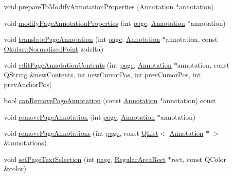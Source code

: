 \begin{DoxyCompactItemize}
\item 
void \hyperlink{classOkular_1_1Document_afa545702ebb74572fd51361c4675bb92}{prepare\+To\+Modify\+Annotation\+Properties} (\hyperlink{classOkular_1_1Annotation}{Annotation} $\ast$annotation)
\item 
void \hyperlink{classOkular_1_1Document_a6124172e56443498f612a32bab2e1e94}{modify\+Page\+Annotation\+Properties} (int \hyperlink{classOkular_1_1Document_a1c95c2f192d739c217d00971da48f69d}{page}, \hyperlink{classOkular_1_1Annotation}{Annotation} $\ast$annotation)
\item 
void \hyperlink{classOkular_1_1Document_ab3ca55619ce1a60a4d60913a216ae01c}{translate\+Page\+Annotation} (int \hyperlink{classOkular_1_1Document_a1c95c2f192d739c217d00971da48f69d}{page}, \hyperlink{classOkular_1_1Annotation}{Annotation} $\ast$annotation, const \hyperlink{classOkular_1_1NormalizedPoint}{Okular\+::\+Normalized\+Point} \&delta)
\item 
void \hyperlink{classOkular_1_1Document_ae179a44288462ef286a7f7e38be8a60c}{edit\+Page\+Annotation\+Contents} (int \hyperlink{classOkular_1_1Document_a1c95c2f192d739c217d00971da48f69d}{page}, \hyperlink{classOkular_1_1Annotation}{Annotation} $\ast$annotation, const Q\+String \&new\+Contents, int new\+Cursor\+Pos, int prev\+Cursor\+Pos, int prev\+Anchor\+Pos)
\item 
bool \hyperlink{classOkular_1_1Document_a77f5c38224da847413dbe51c5e24ed08}{can\+Remove\+Page\+Annotation} (const \hyperlink{classOkular_1_1Annotation}{Annotation} $\ast$annotation) const 
\item 
void \hyperlink{classOkular_1_1Document_af8ae711ce34ff903a589423e73a45cbb}{remove\+Page\+Annotation} (int \hyperlink{classOkular_1_1Document_a1c95c2f192d739c217d00971da48f69d}{page}, \hyperlink{classOkular_1_1Annotation}{Annotation} $\ast$annotation)
\item 
void \hyperlink{classOkular_1_1Document_a5a0c81783a20c5403038e9fc4556ebbc}{remove\+Page\+Annotations} (int \hyperlink{classOkular_1_1Document_a1c95c2f192d739c217d00971da48f69d}{page}, const \hyperlink{classQList}{Q\+List}$<$ \hyperlink{classOkular_1_1Annotation}{Annotation} $\ast$ $>$ \&annotations)
\item 
void \hyperlink{classOkular_1_1Document_ade0f70b9e9e3e08647592555f6c58357}{set\+Page\+Text\+Selection} (int \hyperlink{classOkular_1_1Document_a1c95c2f192d739c217d00971da48f69d}{page}, \hyperlink{classOkular_1_1RegularAreaRect}{Regular\+Area\+Rect} $\ast$rect, const Q\+Color \&color)
\item 

\end{DoxyCompactItemize}
